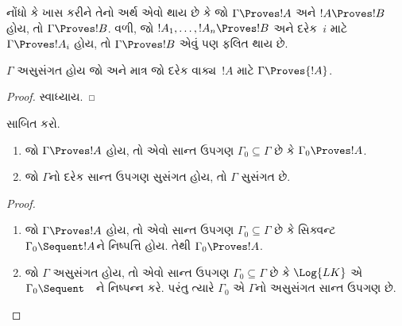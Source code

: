 નોંધો કે ખાસ કરીને તેનો અર્થ એવો
થાય છે કે જો $\Gamma \Proves !A$
અને $!A \Proves !B$ હોય, તો
$\Gamma \Proves !B$. વળી, જો
$!A_1, \dots, !A_n \Proves !B$
અને દરેક~$i$ માટે
$\Gamma \Proves !A_i$ હોય,
તો $\Gamma \Proves !B$
એવું પણ ફલિત થાય છે.

\begin{prop}
$\Gamma$ અસુસંગત હોય જો અને
માત્ર જો દરેક વાક્ય~$!A$ માટે
$\Gamma \Proves {!A}$.
\end{prop}

\begin{proof}
સ્વાધ્યાય.
\end{proof}

\begin{prob}
 સાબિત કરો.

\end{prob}

\begin{prop}[સઘનતા]
  \begin{enumerate}
  \item જો $\Gamma \Proves !A$ હોય, તો
    એવો સાન્ત ઉપગણ $\Gamma_0
    \subseteq \Gamma$ છે કે
    $\Gamma_0 \Proves !A$.
  \item જો $\Gamma$નો દરેક
    સાન્ત ઉપગણ સુસંગત હોય,
    તો $\Gamma$ સુસંગત છે.
  \end{enumerate}
\end{prop}

\begin{proof}
  \begin{enumerate}
    \item જો $\Gamma \Proves !A$ હોય,
      તો એવો સાન્ત ઉપગણ
      $\Gamma_0 \subseteq \Gamma$ છે કે
      સિક્વન્ટ $\Gamma_0
      \Sequent !A$ને
      નિષ્પત્તિ હોય. તેથી
      $\Gamma_0 \Proves !A$.
    \item જો $\Gamma$ અસુસંગત હોય,
      તો એવો સાન્ત ઉપગણ
      $\Gamma_0 \subseteq \Gamma$ છે કે
      $\Log{LK}$ એ $\Gamma_0
      \Sequent \quad$ને
      નિષ્પન્ન કરે. પરંતુ
      ત્યારે $\Gamma_0$ એ
      $\Gamma$નો અસુસંગત
      સાન્ત ઉપગણ છે.
  \end{enumerate}
\end{proof}
\endgroup
\endgroup


\OLEndPartHook
